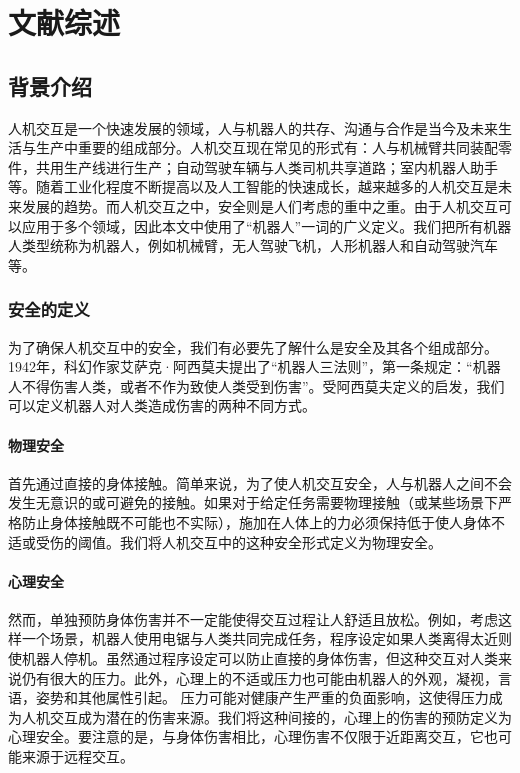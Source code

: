 \cleardoublepage

\chapter{文献综述}

\section{背景介绍}

人机交互是一个快速发展的领域，人与机器人的共存、沟通与合作是当今及未来生活与生产中重要的组成部分。人机交互现在常见的形式有：人与机械臂共同装配零件，共用生产线进行生产；自动驾驶车辆与人类司机共享道路；室内机器人助手等。随着工业化程度不断提高以及人工智能的快速成长，越来越多的人机交互是未来发展的趋势。而人机交互之中，安全则是人们考虑的重中之重。由于人机交互可以应用于多个领域，因此本文中使用了“机器人”一词的广义定义。我们把所有机器人类型统称为机器人，例如机械臂，无人驾驶飞机，人形机器人和自动驾驶汽车等。


\subsection{安全的定义}

为了确保人机交互中的安全，我们有必要先了解什么是安全及其各个组成部分。1942年，科幻作家艾萨克·阿西莫夫提出了“机器人三法则”，第一条规定：“机器人不得伤害人类，或者不作为致使人类受到伤害”。受阿西莫夫定义的启发，我们可以定义机器人对人类造成伤害的两种不同方式。
\subsubsection{物理安全}
首先通过直接的身体接触。简单来说，为了使人机交互安全，人与机器人之间不会发生无意识的或可避免的接触。如果对于给定任务需要物理接触（或某些场景下严格防止身体接触既不可能也不实际），施加在人体上的力必须保持低于使人身体不适或受伤的阈值。我们将人机交互中的这种安全形式定义为物理安全。
\subsubsection{心理安全}
然而，单独预防身体伤害并不一定能使得交互过程让人舒适且放松。例如，考虑这样一个场景，机器人使用电锯与人类共同完成任务，程序设定如果人类离得太近则使机器人停机。虽然通过程序设定可以防止直接的身体伤害，但这种交互对人类来说仍有很大的压力。此外，心理上的不适或压力也可能由机器人的外观，凝视，言语，姿势和其他属性引起。
压力可能对健康产生严重的负面影响，这使得压力成为人机交互成为潜在的伤害来源。我们将这种间接的，心理上的伤害的预防定义为心理安全。要注意的是，与身体伤害相比，心理伤害不仅限于近距离交互，它也可能来源于远程交互。

